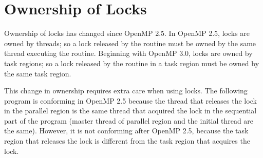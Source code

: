 \pagebreak
\chapter{Ownership of Locks}
\label{chap:lock_owner}

Ownership of locks has changed since OpenMP 2.5. In OpenMP 2.5, locks are owned 
by threads; so a lock released by the  routine must be 
owned by the same thread executing the routine.  Beginning with OpenMP 3.0, locks are owned 
by task regions; so a lock released by the  routine in 
a task region must be owned by the same task region.

This change in ownership requires extra care when using locks. The following program 
is conforming in OpenMP 2.5 because the thread that releases the lock  
in the parallel region is the same thread that acquired the lock in the sequential 
part of the program (master thread of parallel region and the initial thread are 
the same). However, it is not conforming after OpenMP 2.5, because the task 
region that releases the lock  is different from the task region that 
acquires the lock.




